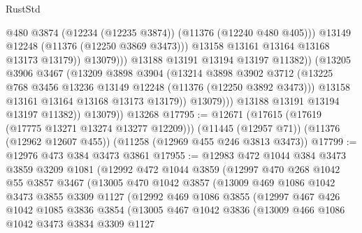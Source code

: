 \begin{lexlean}{RustStd}
\begin{coremodule}
{{{{{{{{{{{{{{{{{{{                                  @480
                                  @3874
                                  (@12234 (@12235 @3874))
                                  (@11376 (@12240 @480 @405)))
                                @13149
                                @12248
                                (@11376 (@12250 @3869 @3473)))
                              @13158
                              @13161
                              @13164
                              @13168
                              @13173
                              @13179))
                          @13079)))
                    @13188
                    @13191
                    @13194
                    @13197
                    @11382))
                (@13205
                  @3906
                  @3467
                  (@13209
                    @3898
                    @3904
                    (@13214
                      @3898
                      @3902
                      @3712
                      (@13225 @768 @3456 @13236 @13149 @12248 (@11376 (@12250 @3892 @3473)))
                      @13158
                      @13161
                      @13164
                      @13168
                      @13173
                      @13179))
                  @13079)))
            @13188
            @13191
            @13194
            @13197
            @11382))
        @13079))
    @13268
@17795 := @12671
    (@17615 (@17619 (@17775 @13271 @13274 @13277 @12209)))
    (@11445 (@12957 @71))
    (@11376 (@12962 @12607 @455))
    (@11258 (@12969 @455 @246 @3813 @3473))
@17799 := @12976 @473 @384 @3473 @3861
@17955 := @12983
    @472
    @1044
    @384
    @3473
    @3859
    @3209
    @1081
    (@12992
      @472
      @1044
      @3859
      (@12997
        @470
        @268
        @1042
        @55
        @3857
        @3467
        (@13005
          @470
          @1042
          @3857
          (@13009
            @469
            @1086
            @1042
            @3473
            @3855
            @3309
            @1127
            (@12992
              @469
              @1086
              @3855
              (@12997
                @467
                @426
                @1042
                @1085
                @3836
                @3854
                (@13005
                  @467
                  @1042
                  @3836
                  (@13009
                    @466
                    @1086
                    @1042
                    @3473
                    @3834
                    @3309
                    @1127
}}}}}}}}}}}}}}}}}}}
\end{coremodule}
\end{lexlean}
